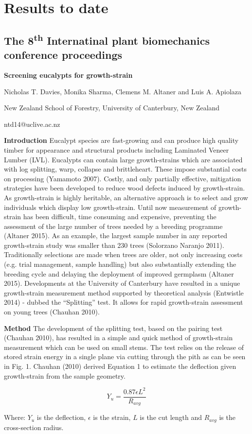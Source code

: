 \section{Results to date}
\subsection{ The 8\textsuperscript{th} Internatinal plant biomechanics conference proceedings}
\begin{center}
\textbf{Screening eucalypts for growth-strain}

Nicholas T. Davies, Monika Sharma, Clemens M. Altaner and Luis A. Apiolaza

New Zealand School of Forestry, University of Canterbury, New Zealand

ntd14@uclive.ac.nz  
\end{center}

\textbf{Introduction}
Eucalypt species are fast-growing and can produce high quality timber for appearance and structural products including Laminated Veneer Lumber (LVL). Eucalypts can contain large growth-strains which are associated with log splitting, warp, collapse and brittleheart. These impose substantial costs on processing (Yamamoto 2007). Costly, and only partially effective, mitigation strategies have been developed to reduce wood defects induced by growth-strain. As growth-strain is highly heritable, an alternative approach is to select and grow individuals which display low growth-strain. Until now measurement of growth-strain has been difficult, time consuming and expensive, preventing the assessment of the large number of trees needed by a breeding programme (Altaner 2015). As an example, the largest sample number in any reported growth-strain study was smaller than 230 trees (Solorzano Naranjo 2011). Traditionally selections are made when trees are older, not only increasing costs (e.g. trial management, sample handling) but also substantially extending the breeding cycle and delaying the deployment of improved germplasm (Altaner 2015). Developments at the University of Canterbury have resulted in a unique growth-strain measurement method supported by theoretical analysis (Entwistle 2014) - dubbed the “Splitting” test. It allows for rapid growth-strain assessment on young trees (Chauhan 2010).

\textbf{Method}
The development of the splitting test, based on the pairing test (Chauhan 2010), has resulted in a simple and quick method of growth-strain measurement which can be used on small stems. The test relies on the release of stored strain energy in a single plane via cutting through the pith as can be seen in Fig. 1. Chauhan (2010) derived Equation 1 to estimate the deflection given growth-strain from the sample geometry.

\begin{equation}
Y_u = \frac{0.87 \epsilon L^2}{R_{avg}}
\end{equation}
  
 Where: \(Y_u\) is the deflection, \(\epsilon\) is the strain, \(L\) is the cut length and \(R_{avg}\) is the cross-section radius. 